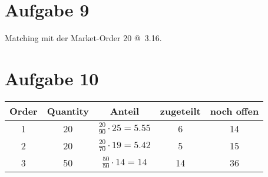 \documentclass{article}
\begin{document}
	\section*{Aufgabe 9}
	Matching mit der Market-Order 20 @ 3.16. 
	
	\section*{Aufgabe 10}
	\begin{center}
		\begin{tabular}{c|c|c|c|c}
			\textbf{Order} & \textbf{Quantity} & \textbf{Anteil} & \textbf{zugeteilt} & \textbf{noch offen} \\
			\hline
			1 & 20 & $\frac{20}{90}\cdot 25 = 5.55$ & 6 & 14 \\
			2 & 20 & $\frac{20}{70}\cdot 19 = 5.42$ & 5 & 15 \\
			3 & 50 & $\frac{50}{50}\cdot 14 = 14$ & 14 & 36
		\end{tabular}
	\end{center}
	
	
\end{document}
